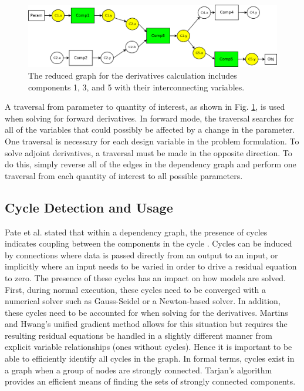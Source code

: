 \documentclass[]{aiaa-tc} %
\begin{document}
        \begin{figure}[!htb]\begin{center}
          \includegraphics[width=.8\textwidth]{images/Graph2}
          \caption{ The reduced graph for the derivatives calculation includes components 1, 3,
          and 5 with their interconnecting variables. \label{fig:graph2}}
        \end{center}\end{figure}

        A traversal from parameter to quantity of interest, as shown in Fig. \ref{fig:graph2}, is used when solving for 
        forward derivatives. In forward mode, the traversal searches for all of the variables that could possibly 
        be affected by a change in the parameter. One traversal is necessary for each design variable in the 
        problem formulation. To solve adjoint derivatives, a traversal must be made in 
        the opposite direction. To do this, simply reverse all of the edges in the dependency graph and 
        perform one traversal from each quantity of interest to all possible parameters. 
        
    \subsection{Cycle Detection and Usage}
        Pate et al. stated that within a dependency graph, the presence of cycles indicates coupling between
        the components in the cycle \cite{graph_problem2013}. Cycles can be induced by connections
        where data is passed directly from an output to an input, or implicitly where an input needs to
        be varied in order to drive a residual equation to zero. The presence of these cycles has 
        an impact on how models are solved. First, during normal execution, these cycles 
        need to be converged with a numerical solver such as Gauss-Seidel or a Newton-based solver.
        In addition, these cycles need to be accounted for when solving for the derivatives. Martins and Hwang's 
        unified gradient method allows for this situation but requires the resulting residual equations be
        handled in a slightly different manner from explicit variable relationships (ones without cycles). Hence 
        it is important to be able to efficiently identify all cycles in the graph. In formal terms, 
        cycles exist in a graph when a group of nodes are strongly connected. Tarjan's algorithm provides 
        an efficient means of finding the sets of strongly connected components\cite{tarjan1972depth,nuutila1994finding}. 
\end{document}
